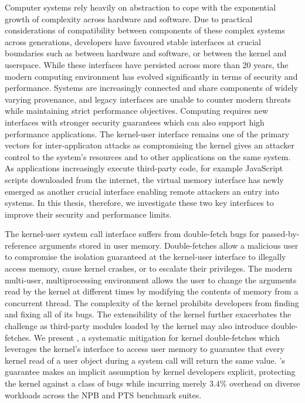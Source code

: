 Computer systems rely heavily on abstraction to cope with the exponential
growth of complexity across hardware and software.
Due to practical considerations of compatibility between components of
these complex systems across generations, developers have favoured stable 
interfaces at crucial boundaries such as between hardware and software, 
or between the kernel and userspace.
While these interfaces have persisted across more than 20 years, the modern 
computing
environment has evolved significantly in terms of security and performance.
Systems are increasingly connected and share components of widely varying
provenance, and legacy interfaces are unable to counter modern threats
while maintaining strict performance objectives.
Computing requires new interfaces with stronger security guarantees which
can also support high performance applications.
The kernel-user interface remains one of the primary vectors for 
inter-applicaton attacks
as compromising the kernel gives an attacker control to the system's resources
and to other applications on the same system.
As applications increasingly execute third-party code, for example JavaScript
scripts downloaded from the internet, the virtual memory interface
has newly emerged as another crucial interface enabling remote attackers
an entry into systems.
In this thesis, therefore, we investigate these two key interfaces to 
improve their security and performance limits.

The kernel-user system call interface suffers from double-fetch
bugs for passed-by-reference arguments stored in user memory.
Double-fetches allow a malicious user to compromise the isolation guaranteed 
at the kernel-user interface to illegally access memory,
cause kernel crashes, or to escalate their privileges.
The modern multi-user, multiprocessing environment allows the user to
change the arguments read by the kernel at different times by modifying
the contents of memory from a concurrent thread.
The complexity of the kernel prohibits developers from finding and fixing all
of its bugs.
The extensibility of the kernel further exacerbates the challenge as 
third-party modules loaded by the kernel may also introduce double-fetches.
We present \midas, a systematic mitigation for kernel double-fetches which
leverages the kernel's interface to access user memory to guarantee that 
every kernel read of a user object during a system call will return the 
same value.
\midas's guarantee makes an implicit assumption by kernel developers
explicit, protecting the kernel against a class of bugs while incurring
merely $3.4\%$ overhead on diverse workloads across the NPB and PTS 
benchmark suites.

